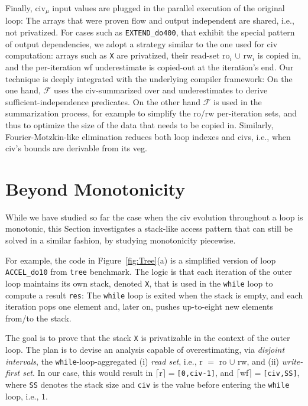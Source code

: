 \documentclass{sig-alternate}
\begin{document}
Finally, {\sc civ}$_\mu$ input values are plugged in the 
parallel execution of the original loop: The arrays that were proven flow and output
independent are shared, i.e., not privatized.   For cases such as {\tt EXTEND\_do400},
that exhibit the special pattern of output dependencies, we adopt a strategy similar
to the one used for {\sc civ} computation: arrays such as {\tt X} are privatized,
their read-set {\sc ro}$_i$ $\cup$ {\sc rw}$_i$ is copied in, and the per-iteration {\sc wf} underestimate
is copied-out at the iteration's end.   Our technique is deeply integrated with the
underlying compiler framework: On the one hand, $\mathcal{F}$ uses the {\sc civ}-summarized
over and underestimates to derive sufficient-independence predicates.
%
On the other hand $\mathcal{F}$ is used in the summarization process, for example 
to simplify the {\sc ro}/{\sc rw} per-iteration sets, and thus to optimize the 
size of the data that needs to be copied in.  Similarly, Fourier-Motzkin-like
elimination reduces both loop indexes and {\sc civ}s, i.e., when {\sc civ}'s 
bounds are derivable from its {\sc veg}. %




\section{Beyond Monotonicity} %
\label{sec:Stack}

While we have studied so far the case when the {\sc civ} evolution
throughout a loop is monotonic, this Section investigates a stack-like 
access pattern that can still be solved in a similar fashion, by 
studying monotonicity piecewise.
 
For example, the code in Figure~\ref{fig:Tree}(a) is a simplified
version of loop {\tt ACCEL\_do10} from {\tt tree} benchmark. 
The logic is that each iteration of the outer loop maintains its own
stack, denoted {\tt X}, that is used in the {\tt while} loop to 
compute a result {\tt res}:
The {\tt while} loop is exited when the stack is empty, and each
iteration pops one element and, later on, pushes
up-to-eight new elements from/to the stack. 

The goal is to prove that the stack {\tt X} is privatizable in the
context of the outer loop.   The plan is to devise an analysis
capable of overestimating, via {\em disjoint intervals}, the   %
{\tt while}-loop-aggregated (i) {\em read set}, i.e., 
{\sc r} $=$ {\sc ro} $\cup$ {\sc rw}, and (ii) {\em write-first set}. 
In our case, this would result in  
$\lceil${\sc r}$\rceil=${\tt[0,civ-1]}, and
$\lceil${\sc wf}$\rceil=${\tt[civ,SS]}, where {\tt SS} denotes
the stack size and  {\tt civ} is the value before entering the 
{\tt while} loop, i.e., $1$.  
\end{document}

